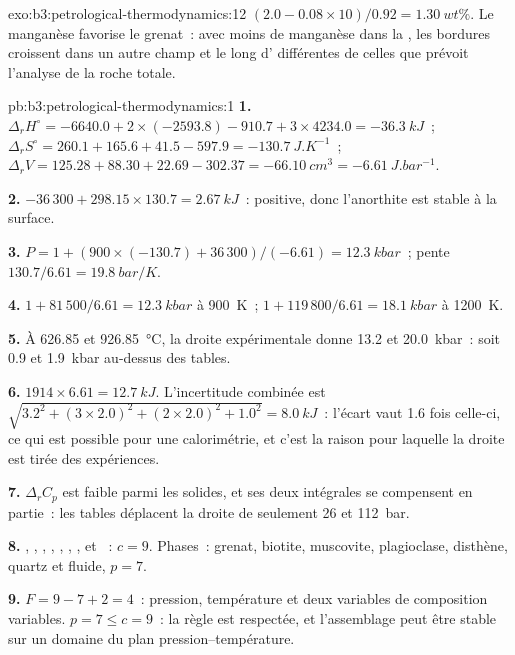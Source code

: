 \begin{solution}{exo:b3:petrological-thermodynamics:12}
$(2.0 - 0.08\times10)/0.92 = \qty{1.30}{wt\percent}$. Le manganèse favorise
le grenat~: avec moins de manganèse dans la , les
bordures croissent dans un autre champ et le long d' différentes de
celles que prévoit l'analyse de la roche totale.
\end{solution}

\begin{solution}{pb:b3:petrological-thermodynamics:1}
\textbf{1.} $\Delta_rH^\circ = -6640.0 + 2\times(-2593.8) - 910.7 + 3\times4234.0
= \qty{-36.3}{kJ}$~; $\Delta_rS^\circ = 260.1 + 165.6 + 41.5 - 597.9 =
\qty{-130.7}{J.K^{-1}}$~; $\Delta_rV = 125.28 + 88.30 + 22.69 - 302.37 =
\qty{-66.10}{cm^3} = \qty{-6.61}{J.bar^{-1}}$.

\textbf{2.} $-36\,300 + 298.15\times130.7 = \qty{+2.67}{kJ}$~: positive, donc
l'anorthite est stable à la surface.

\textbf{3.} $P = 1 + (900\times(-130.7) + 36\,300)/(-6.61) = \qty{12.3}{kbar}$~;
pente $130.7/6.61 = \qty{19.8}{bar/K}$.

\textbf{4.} $1 + 81\,500/6.61 = \qty{12.3}{kbar}$ à \qty{900}{K}~; $1 +
119\,800/6.61 = \qty{18.1}{kbar}$ à \qty{1200}{K}.

\textbf{5.} À 626.85 et \qty{926.85}{\celsius}, la droite expérimentale donne
13.2 et \qty{20.0}{kbar}~: soit 0.9 et \qty{1.9}{kbar} au-dessus des tables.

\textbf{6.} $1914\times6.61 = \qty{12.7}{kJ}$. L'incertitude combinée est
$\sqrt{3.2^2 + (3\times2.0)^2 + (2\times2.0)^2 + 1.0^2} = \qty{8.0}{kJ}$~: l'écart
vaut 1.6 fois celle-ci, ce qui est possible pour une calorimétrie, et c'est la
raison pour laquelle la droite est tirée des expériences.

\textbf{7.} $\Delta_rC_p$ est faible parmi les solides, et ses deux intégrales
se compensent en partie~: les tables déplacent la droite de seulement 26 et \qty{112}{bar}.

\textbf{8.} , , , , , ,
,  et ~: $c = 9$. Phases~: grenat, biotite,
muscovite, plagioclase, disthène, quartz et fluide, $p = 7$.

\textbf{9.} $F = 9 - 7 + 2 = 4$~: pression, température et deux variables de composition
variables. $p = 7 \le c = 9$~: la règle est respectée, et l'assemblage peut être stable
sur un domaine du plan pression--température.


\end{solution}
